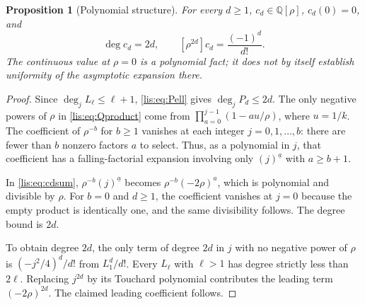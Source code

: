 \documentclass[11pt,letterpaper]{article}
\numberwithin{equation}{section}
\newtheorem{proposition}[theorem]{Proposition}
\theoremstyle{definition}
\newcommand{\Q}{\mathbb Q}
\newcommand{\fall}[2]{(#1)^{\underline{#2}}}
\begin{document}
\begin{proposition}[Polynomial structure]\label{lis:prop:polynomial}
For every $d\ge1$, $c_d\in\Q[\rho]$, $c_d(0)=0$, and
\begin{equation}
 \deg c_d=2d,\qquad
 [\rho^{2d}]c_d=\frac{(-1)^d}{d!}.
 \label{lis:eq:degree}
\end{equation}
The continuous value at $\rho=0$ is a polynomial fact; it does not
by itself establish uniformity of the asymptotic expansion there.
\end{proposition}
\begin{proof}
Since $\deg_j L_\ell\le\ell+1$, \eqref{lis:eq:Pell} gives
$\deg_j P_d\le2d$. The only negative powers of $\rho$ in
\eqref{lis:eq:Qproduct} come from $\prod_{a=0}^{j-1}(1-a u/\rho)$,
where $u=1/k$. The coefficient of $\rho^{-b}$ for $b\ge1$ vanishes
at each integer $j=0,1,\ldots,b$: there are fewer than $b$ nonzero
factors $a$ to select. Thus, as a polynomial in $j$, that coefficient
has a falling-factorial expansion involving only $\fall{j}{a}$ with
$a\ge b+1$.

In \eqref{lis:eq:cdsum}, $\rho^{-b}\fall{j}{a}$ becomes
$\rho^{-b}(-2\rho)^a$, which is polynomial and divisible by $\rho$.
For $b=0$ and $d\ge1$, the coefficient vanishes at $j=0$ because the
empty product is identically one, and the same divisibility follows.
The degree bound is $2d$.

To obtain degree $2d$, the only term of degree $2d$ in $j$ with no
negative power of $\rho$ is $(-j^2/4)^d/d!$ from $L_1^d/d!$.
Every $L_\ell$ with $\ell>1$ has degree strictly less than $2\ell$.
Replacing $j^{2d}$ by its Touchard polynomial contributes the leading
term $(-2\rho)^{2d}$. The claimed leading coefficient follows.
\end{proof}
\end{document}
